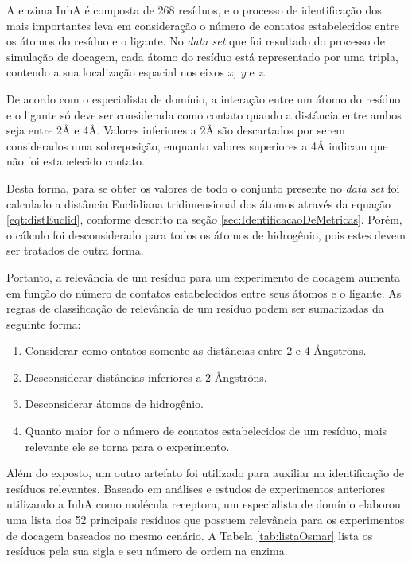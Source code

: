A enzima InhA é composta de 268 resíduos, e o processo de identificação dos mais importantes leva em consideração o número de contatos estabelecidos entre os átomos do resíduo e o ligante. No \emph{data set} que foi resultado do processo de simulação de docagem, cada átomo do resíduo está representado por uma tripla, contendo a sua localização espacial nos eixos \emph{x, y }e \emph{z}.

De acordo com o especialista de domínio, a interação entre um átomo do resíduo e o ligante só deve ser considerada como contato quando a distância entre ambos seja entre 2{\AA} e 4{\AA}. Valores inferiores a 2{\AA} são descartados por serem considerados uma sobreposição, enquanto valores superiores a 4{\AA} indicam que não foi estabelecido contato. 

Desta forma, para se obter os valores de todo o conjunto presente no \emph{data set} foi calculado a distância Euclidiana tridimensional dos átomos através da equação \ref{eqt:distEuclid}, conforme descrito na seção \ref{sec:IdentificacaoDeMetricas}. Porém, o cálculo foi desconsiderado para todos os átomos de hidrogênio, pois estes devem ser tratados de outra forma.

Portanto, a relevância de um resíduo para um experimento de docagem aumenta em função do número de contatos estabelecidos entre seus átomos e o ligante. As regras de classificação de relevância de um resíduo podem ser sumarizadas da seguinte forma:

\begin{enumerate}
	\item Considerar como ontatos somente as distâncias entre 2 e 4 {\AA}ngstr\"ons.
	\item Desconsiderar distâncias inferiores a 2 {\AA}ngstr\"ons.
	\item Desconsiderar átomos de hidrogênio.
	\item Quanto maior for o número de contatos estabelecidos de um resíduo, mais relevante ele se torna para o experimento.
\end{enumerate}

Além do exposto, um outro artefato foi utilizado para auxiliar na identificação de resíduos relevantes. Baseado em análises e estudos de experimentos anteriores utilizando a InhA como molécula receptora, um especialista de domínio elaborou uma lista dos 52 principais resíduos que possuem relevância para os experimentos de docagem baseados no mesmo cenário. A Tabela \ref{tab:listaOsmar} lista os resíduos pela sua sigla e seu número de ordem na enzima.

